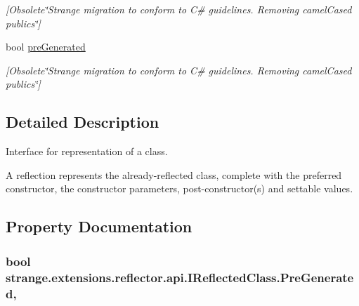 \begin{DoxyCompactItemize}
\begin{DoxyCompactList}\small\item\em \mbox{[}Obsolete\char`\"{}\-Strange migration to conform to C\# guidelines. Removing camel\-Cased publics\char`\"{}\mbox{]} \end{DoxyCompactList}\item 
\hypertarget{interfacestrange_1_1extensions_1_1reflector_1_1api_1_1_i_reflected_class_a902b6a963d4f1c3ec30a91d726d79020}{bool \hyperlink{interfacestrange_1_1extensions_1_1reflector_1_1api_1_1_i_reflected_class_a902b6a963d4f1c3ec30a91d726d79020}{pre\-Generated}}\label{interfacestrange_1_1extensions_1_1reflector_1_1api_1_1_i_reflected_class_a902b6a963d4f1c3ec30a91d726d79020}

\begin{DoxyCompactList}\small\item\em \mbox{[}Obsolete\char`\"{}\-Strange migration to conform to C\# guidelines. Removing camel\-Cased publics\char`\"{}\mbox{]} \end{DoxyCompactList}\end{DoxyCompactItemize}


\subsection{Detailed Description}
Interface for representation of a class. 

A reflection represents the already-\/reflected class, complete with the preferred constructor, the constructor parameters, post-\/constructor(s) and settable values. 

\subsection{Property Documentation}
\hypertarget{interfacestrange_1_1extensions_1_1reflector_1_1api_1_1_i_reflected_class_a61e16c964d8148fcea8c35055e7f8dc5}{
\subsubsection[{Pre\-Generated}]{\setlength{\rightskip}{0pt plus 5cm}bool strange.\-extensions.\-reflector.\-api.\-I\-Reflected\-Class.\-Pre\-Generated\hspace{0.3cm}{\ttfamily [get]}, {\ttfamily [set]}}}\label{interfacestrange_1_1extensions_1_1reflector_1_1api_1_1_i_reflected_class_a61e16c964d8148fcea8c35055e7f8dc5}


